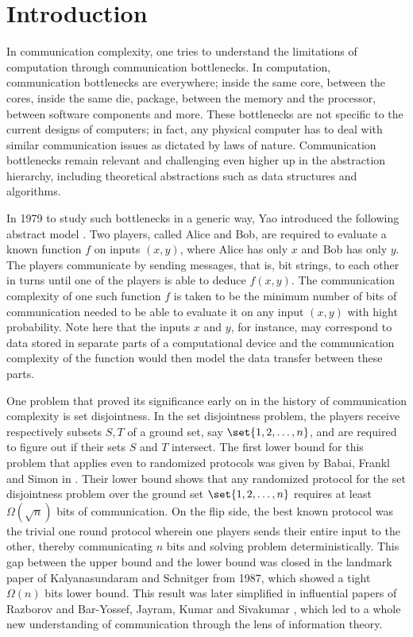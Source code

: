 \chapter{Introduction}
\label{sec:introduction}

In communication complexity, one tries to understand the 
limitations of computation through communication bottlenecks. 
In computation, communication bottlenecks are everywhere; 
inside the same core, between the cores, inside the same die, package, 
between the memory and the processor, between software components and more. 
These bottlenecks are not specific to the current designs of computers; 
in fact, any physical computer has to deal with similar communication 
issues as dictated by laws of nature.
Communication bottlenecks remain relevant and challenging even higher up in the 
abstraction hierarchy, including theoretical abstractions such as data structures
and algorithms.

In 1979 to study such bottlenecks in a generic way, 
Yao introduced the following abstract model \cite{Yao1979}. 
Two players, called Alice and Bob, are required to evaluate a known 
function $f$ on inputs $(x,y)$, where Alice has only $x$ and Bob has only $y$.
The players communicate by sending messages, that is, bit strings, to each other 
in turns until one of the players is able to deduce $f(x,y)$. The communication
complexity of one such function $f$ is taken to be the minimum number of bits
of communication needed to be able to evaluate it on any input $(x,y)$
with hight probability. Note here that the inputs $x$ and $y$, for instance, 
may correspond to data stored in separate parts of a computational device and 
the communication complexity of the function would then model the data transfer 
between these parts. 

One problem that proved its significance early on in the history of 
communication complexity is set disjointness. 
In the set disjointness problem, the players receive respectively subsets $S, T$ 
of a ground set, say $\set{1,2,\ldots,n}$, and are required to figure out 
if their sets $S$ and $T$ intersect.
The first lower bound for this problem that applies even to randomized protocols
was given by Babai, Frankl and Simon in \cite{BabaiFS1986}. Their lower bound
shows that any randomized protocol for the set disjointness problem over 
the ground set $\set{1,2,\ldots, n}$
requires at least $\Omega(\sqrt{n})$ bits of communication.
On the flip side, the best known protocol 
was the trivial one round protocol wherein one players sends their entire 
input to the other, thereby communicating
$n$ bits and solving problem deterministically.
This gap between the upper bound and the lower bound was closed
in the landmark paper of Kalyanasundaram and Schnitger from 1987,
which showed a tight $\Omega(n)$ bits lower bound. This result was later 
simplified in
influential papers of Razborov \cite{Razborov1992} and Bar-Yossef, Jayram, Kumar and Sivakumar
\cite{Bar-YossefJKS2004}, which led to a whole new understanding of 
communication through the lens of
information theory.

